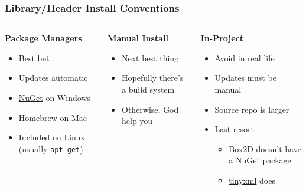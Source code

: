 \documentclass[glossy]{beamer}
\begin{document}

\begin{frame}[fragile=singleslide]
  \frametitle{Library/Header Install Conventions}

  \begin{columns}[t]
    \begin{column}{4cm}
      \textbf{Package Managers}
      \begin{itemize}
        \item Best bet
        \item Updates automatic
        \item \href{https://www.nuget.org/}{NuGet} on Windows
        \item \href{http://brew.sh/}{Homebrew} on Mac
        \item Included on Linux (usually \texttt{apt-get})
      \end{itemize}
    \end{column}

    \begin{column}{4cm}
      \textbf{Manual Install}
      \begin{itemize}
        \item Next best thing
        \item Hopefully there's a build system
        \item Otherwise, God help you
      \end{itemize}
    \end{column}

    \begin{column}{4cm}
      \textbf{In-Project}
      \begin{itemize}
        \item Avoid in real life
        \item Updates must be manual
        \item Source repo is larger
        \item Last resort
        \begin{itemize}
          \item Box2D doesn't have a NuGet package
          \item \href{http://www.grinninglizard.com/tinyxml2/}{tinyxml} does
        \end{itemize}
      \end{itemize}
    \end{column}
  \end{columns}
\end{frame}
\end{document}
